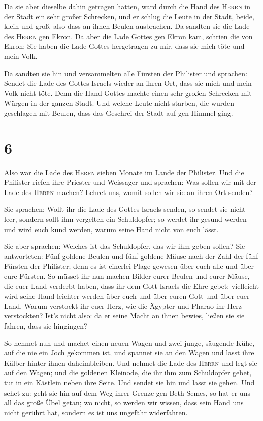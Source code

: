  Da sie aber dieselbe dahin getragen hatten, ward durch
die Hand des \textsc{Herrn} in der Stadt ein sehr großer Schrecken, und
er schlug die Leute in der Stadt, beide, klein und groß, also dass an
ihnen Beulen ausbrachen.  Da sandten sie die Lade des
\textsc{Herrn} gen Ekron. Da aber die Lade Gottes gen Ekron kam, schrien
die von Ekron: Sie haben die Lade Gottes hergetragen zu mir, dass sie
mich töte und mein Volk.

 Da sandten sie hin und versammelten alle Fürsten der
Philister und sprachen: Sendet die Lade des Gottes Israels wieder an
ihren Ort, dass sie mich und mein Volk nicht töte. Denn die Hand Gottes
machte einen sehr großen Schrecken mit Würgen in der ganzen Stadt.
 Und welche Leute nicht starben, die wurden geschlagen
mit Beulen, dass das Geschrei der Stadt auf gen Himmel ging.

\hypertarget{section-5}{%
\section{6}\label{section-5}}

 Also war die Lade des \textsc{Herrn} sieben Monate im
Lande der Philister.  Und die Philister riefen ihre
Priester und Weissager und sprachen: Was sollen wir mit der Lade des
\textsc{Herrn} machen? Lehret uns, womit sollen wir sie an ihren Ort
senden?

 Sie sprachen: Wollt ihr die Lade des Gottes Israels
senden, so sendet sie nicht leer, sondern sollt ihm vergelten ein
Schuldopfer; so werdet ihr gesund werden und wird euch kund werden,
warum seine Hand nicht von euch lässt.

 Sie aber sprachen: Welches ist das Schuldopfer, das wir
ihm geben sollen? Sie antworteten: Fünf goldene Beulen und fünf goldene
Mäuse nach der Zahl der fünf Fürsten der Philister; denn es ist einerlei
Plage gewesen über euch alle und über eure Fürsten.  So
müsset ihr nun machen Bilder eurer Beulen und eurer Mäuse, die euer Land
verderbt haben, dass ihr dem Gott Israels die Ehre gebet; vielleicht
wird seine Hand leichter werden über euch und über euren Gott und über
euer Land.  Warum verstockt ihr euer Herz, wie die Ägypter
und Pharao ihr Herz verstockten? Ist's nicht also: da er seine Macht an
ihnen bewies, ließen sie sie fahren, dass sie hingingen?

 So nehmet nun und machet einen neuen Wagen und zwei
junge, säugende Kühe, auf die nie ein Joch gekommen ist, und spannet sie
an den Wagen und lasst ihre Kälber hinter ihnen daheimbleiben.
 Und nehmet die Lade des \textsc{Herrn} und legt sie auf
den Wagen; und die goldenen Kleinode, die ihr ihm zum Schuldopfer gebet,
tut in ein Kästlein neben ihre Seite. Und sendet sie hin und lasst sie
gehen.  Und sehet zu: geht sie hin auf dem Weg ihrer
Grenze gen Beth-Semes, so hat er uns all das große Übel getan; wo nicht,
so werden wir wissen, dass sein Hand uns nicht gerührt hat, sondern es
ist uns ungefähr widerfahren.

